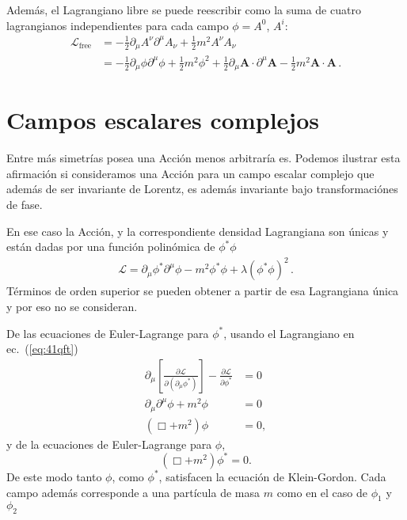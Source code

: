 \begin{frame}
Además, el Lagrangiano libre se puede reescribir como la suma de cuatro lagrangianos independientes para cada campo $\phi=A^0$, $A^i$:
\begin{align}
  \mathcal{L}_{\text{free}}&=-\frac{1}{2}\partial_\mu A^\nu\partial^\mu A_\nu+\frac{1}{2} m^2A^\nu A_\nu\nonumber\\
  &=-\frac{1}{2}\partial_\mu \phi\partial^\mu \phi+\frac{1}{2} m^2\phi^2
   +\frac{1}{2}\partial_\mu \boldsymbol{A}\cdot \partial^\mu \boldsymbol{A}-\frac{1}{2} m^2\boldsymbol{A}\cdot \boldsymbol{A}\,.
\end{align}

\end{frame}





\section{Campos escalares complejos}
Entre más simetrías posea una Acción menos arbitraría es. Podemos
ilustrar esta afirmación si consideramos una Acción para un campo escalar
complejo que además de ser invariante de Lorentz, es además invariante
bajo transformaciónes de fase.

\begin{frame}


En ese caso la Acción, y la correspondiente densidad Lagrangiana son
únicas y están dadas por una función polinómica de $\phi^{*}\phi$
\begin{align}
  \mathcal{L}=\partial_{\mu}\phi^{*} \partial^{\mu}\phi-m^2\phi^{*}\phi+\lambda \left(\phi^{*}\phi \right)^2\,.
\end{align}
Términos de orden superior se pueden obtener a partir de esa
Lagrangiana única y por eso no se consideran. 
\end{frame}

De las ecuaciones de Euler-Lagrange para $\phi^*$, usando el Lagrangiano en ec.~(\ref{eq:41qft})
\begin{align}
  \partial_\mu\left[
      \frac{\partial\mathcal{L}}{\partial(\partial_\mu\phi^*)}\right]-\frac{\partial\mathcal{L}}{\partial\phi^*}&=0\nonumber\\
    \partial_\mu\partial^\mu\phi+m^2\phi&=0\nonumber\\
    \label{eq:43qft}
    (\Box+m^2)\phi&=0,
\end{align}
y de la ecuaciones de Euler-Lagrange para $\phi$,
\begin{equation}
  \label{eq:44qft}
    (\Box+m^2)\phi^*=0.
\end{equation}
De este modo tanto $\phi$, como $\phi^*$, satisfacen la ecuación de Klein-Gordon. Cada campo además corresponde a una partícula de masa $m$ como en el caso de $\phi_1$ y $\phi_2$

